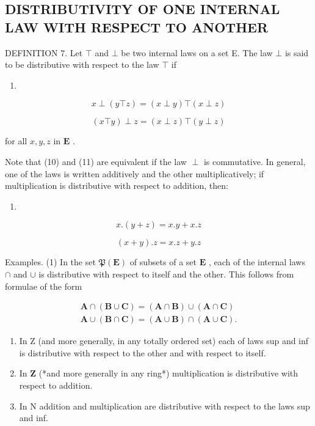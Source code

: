 \subsection{DISTRIBUTIVITY OF ONE INTERNAL LAW WITH RESPECT TO ANOTHER}

DEFINITION 7. Let \(\top\) and \(\bot\) be two internal laws on a set E. The law \(\bot\) is said to be distributive with respect to the law \(\top\) if

\begin{enumerate}
\def\labelenumi{(\arabic{enumi})}
\setcounter{enumi}{9}
\tightlist
\item
\end{enumerate}

\[
x \perp (y \top z) = (x \perp y) \top (x \perp z)\tag{11}
\]

\[
(x \top y) \perp z = (x \perp z) \top (y \perp z)
\]

for all \(x, y, z\) in \(\mathbf{E}\) .

Note that (10) and (11) are equivalent if the law \(\perp\) is commutative. In general, one of the laws is written additively and the other multiplicatively; if multiplication is distributive with respect to addition, then:

\begin{enumerate}
\def\labelenumi{(\arabic{enumi})}
\setcounter{enumi}{11}
\tightlist
\item
\end{enumerate}

\[
x. (y + z) = x. y + x. z\tag{13}
\]

\[
(x + y). z = x. z + y. z
\]

Examples. (1) In the set \(\mathfrak{P}(\mathbf{E})\) of subsets of a set \(\mathbf{E}\) , each of the internal laws \(\cap\) and \(\cup\) is distributive with respect to itself and the other. This follows from formulae of the form

\[
\begin{array}{l} \mathbf {A} \cap (\mathbf {B} \cup \mathbf {C}) = (\mathbf {A} \cap \mathbf {B}) \cup (\mathbf {A} \cap \mathbf {C}) \\ \mathbf {A} \cup (\mathbf {B} \cap \mathbf {C}) = (\mathbf {A} \cup \mathbf {B}) \cap (\mathbf {A} \cup \mathbf {C}). \end{array}
\]

\begin{enumerate}
\def\labelenumi{(\arabic{enumi})}
\setcounter{enumi}{1}
\item
  In Z (and more generally, in any totally ordered set) each of laws sup and inf is distributive with respect to the other and with respect to itself.
\item
  In \(\mathbf{Z}\) (*and more generally in any ring*) multiplication is distributive with respect to addition.
\item
  In N addition and multiplication are distributive with respect to the laws sup and inf.
\end{enumerate}

